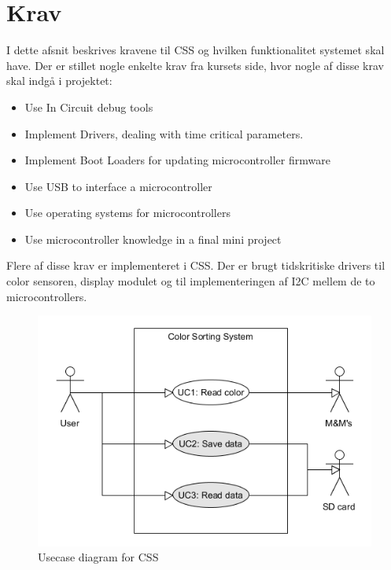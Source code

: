 \graphicspath{{Chapters/Krav/}}


\section{Krav}
I dette afsnit beskrives kravene til CSS og hvilken funktionalitet systemet skal have. Der er stillet nogle enkelte krav fra kursets side, hvor nogle af disse krav skal indgå i projektet:

\begin{itemize}
	\item Use In Circuit debug tools
	
	\item Implement Drivers, dealing with time critical parameters.
	
	\item Implement Boot Loaders for updating microcontroller firmware
	
	\item Use USB to interface a microcontroller
	
	\item Use operating systems for microcontrollers
	
	\item Use microcontroller knowledge in a final mini project
	
\end{itemize}

Flere af disse krav er implementeret i CSS. Der er brugt tidskritiske drivers til color sensoren, display modulet og til implementeringen af I2C mellem de to microcontrollers. 

\begin{figure}[H]
	\centering
	\includegraphics[width = 400pt]{Img/Usecase_diagram.png}
	\caption{Usecase diagram for CSS}
	\label{fig:UsecaseDiagram}
\end{figure}

